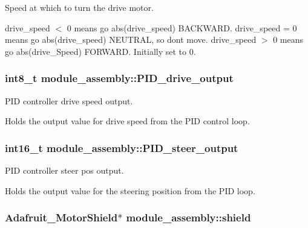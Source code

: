 Speed at which to turn the drive motor. 

drive\+\_\+speed $<$ 0 means go abs(drive\+\_\+speed) B\+A\+C\+K\+W\+A\+R\+D. drive\+\_\+speed = 0 means go abs(drive\+\_\+speed) N\+E\+U\+T\+R\+A\+L, so don\textquotesingle{}t move. drive\+\_\+speed $>$ 0 means go abs(drive\+\_\+\+Speed) F\+O\+R\+W\+A\+R\+D. Initially set to 0. \hypertarget{structmodule__assembly_a987ebb08eef885c780ce16cb747ad4b8}{}
\subsubsection[{P\+I\+D\+\_\+drive\+\_\+output}]{\setlength{\rightskip}{0pt plus 5cm}int8\+\_\+t module\+\_\+assembly\+::\+P\+I\+D\+\_\+drive\+\_\+output}\label{structmodule__assembly_a987ebb08eef885c780ce16cb747ad4b8}


P\+I\+D controller drive speed output. 

Holds the output value for drive speed from the P\+I\+D control loop. \hypertarget{structmodule__assembly_a4acd38bec79f8a8afcd4c4ec357569da}{}
\subsubsection[{P\+I\+D\+\_\+steer\+\_\+output}]{\setlength{\rightskip}{0pt plus 5cm}int16\+\_\+t module\+\_\+assembly\+::\+P\+I\+D\+\_\+steer\+\_\+output}\label{structmodule__assembly_a4acd38bec79f8a8afcd4c4ec357569da}


P\+I\+D controller steer pos output. 

Holds the output value for the steering position from the P\+I\+D loop. \hypertarget{structmodule__assembly_a803c57702021d99f89c3b393aabf3a50}{}
\subsubsection[{shield}]{\setlength{\rightskip}{0pt plus 5cm}Adafruit\+\_\+\+Motor\+Shield$\ast$ module\+\_\+assembly\+::shield}\label{structmodule__assembly_a803c57702021d99f89c3b393aabf3a50}


